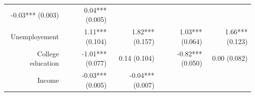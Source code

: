 \documentclass[]{article}
\begin{document}
\begin{longtable}[c]{@{}rrrrr@{}}
\begin{minipage}[t]{0.18\columnwidth}\raggedleft\strut
-0.03*** (0.003)
\strut\end{minipage} &
\begin{minipage}[t]{0.15\columnwidth}\raggedleft\strut
0.04*** (0.005)
\strut\end{minipage}\tabularnewline
\begin{minipage}[t]{0.17\columnwidth}\raggedleft\strut
Unemployement
\strut\end{minipage} &
\begin{minipage}[t]{0.20\columnwidth}\raggedleft\strut
1.11*** (0.104)
\strut\end{minipage} &
\begin{minipage}[t]{0.16\columnwidth}\raggedleft\strut
1.82*** (0.157)
\strut\end{minipage} &
\begin{minipage}[t]{0.18\columnwidth}\raggedleft\strut
1.03*** (0.064)
\strut\end{minipage} &
\begin{minipage}[t]{0.15\columnwidth}\raggedleft\strut
1.66*** (0.123)
\strut\end{minipage}\tabularnewline
\begin{minipage}[t]{0.17\columnwidth}\raggedleft\strut
College education
\strut\end{minipage} &
\begin{minipage}[t]{0.20\columnwidth}\raggedleft\strut
-1.01*** (0.077)
\strut\end{minipage} &
\begin{minipage}[t]{0.16\columnwidth}\raggedleft\strut
0.14 (0.104)
\strut\end{minipage} &
\begin{minipage}[t]{0.18\columnwidth}\raggedleft\strut
-0.82*** (0.050)
\strut\end{minipage} &
\begin{minipage}[t]{0.15\columnwidth}\raggedleft\strut
0.00 (0.082)
\strut\end{minipage}\tabularnewline
\begin{minipage}[t]{0.17\columnwidth}\raggedleft\strut
Income
\strut\end{minipage} &
\begin{minipage}[t]{0.20\columnwidth}\raggedleft\strut
-0.03*** (0.005)
\strut\end{minipage} &
\begin{minipage}[t]{0.16\columnwidth}\raggedleft\strut
-0.04*** (0.007)
\strut\end{minipage} &

\end{longtable}
\end{document}
